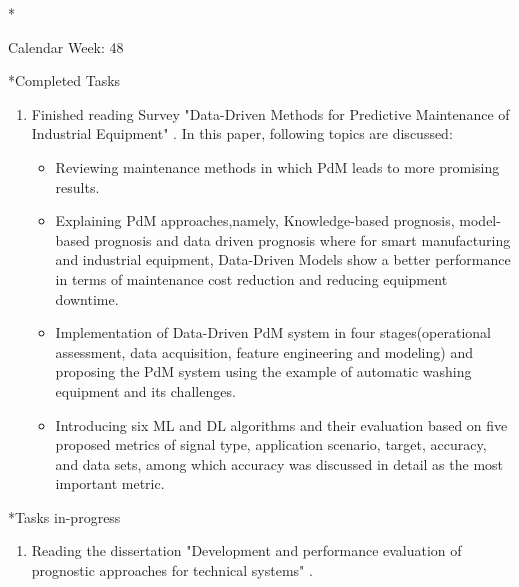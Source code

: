 \documentclass[11pt,a4paper]{article}
\begin{document}
\newpage
\begin{section}*{Calendar Week: 48 \hfill \date{27 November, 2020}}
 \begin{refsection}

       \begin{subsection}*{Completed Tasks}
             \begin{enumerate}
                   \item
                         Finished reading Survey "Data-Driven Methods for Predictive Maintenance of Industrial Equipment" \cite{DBLP:journals/sj/ZhangYW19}.
                        In this paper, following topics are discussed:
                         \begin{itemize}
                             \item Reviewing maintenance methods in which PdM leads to more promising results.
                            \item Explaining PdM approaches,namely, Knowledge-based prognosis, model-based prognosis
                            and data driven prognosis where for smart manufacturing and industrial equipment, Data-Driven Models show a better performance in terms of maintenance cost reduction and reducing equipment downtime.
                            \item Implementation of Data-Driven PdM system in four stages(operational assessment, data acquisition, feature engineering and modeling) and proposing the PdM system using the example of automatic washing equipment and its challenges.
                            \item Introducing six ML and DL algorithms and their evaluation based on five proposed metrics of signal type, application scenario, target, accuracy, and data sets, among which accuracy was discussed in detail as the most important metric.
                        \end{itemize}
             \end{enumerate}
       \end{subsection}

       \begin{subsection}*{Tasks in-progress}
             \begin{enumerate}
                   \item
                     Reading the dissertation "Development and performance evaluation of prognostic approaches for technical systems" \cite{DBLP:phd/dnb/Kimotho16}.
             \end{enumerate}
       \end{subsection}

       \printbibliography
 \end{refsection}
\end{section}
\end{document}

